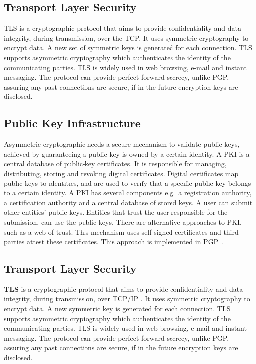 \subsection{Transport Layer Security}\label{chap:background:crypto:tls}

\ac{TLS} is a cryptographic protocol that aims to provide confidentiality and data integrity, during transmission, over the \ac{TCP}. It uses symmetric cryptography to encrypt data. A new set of symmetric keys is generated for each connection.
TLS supports asymmetric cryptography which authenticates the identity of the communicating parties.
TLS is widely used in web browsing, e-mail and instant messaging.
The protocol can provide perfect forward secrecy, unlike PGP, assuring any past connections are secure, if in the future encryption keys are disclosed.

\subsection{Public Key Infrastructure}\label{chap:background:PKI}

Asymmetric cryptographic needs a secure mechanism to validate public keys, achieved by guaranteeing a public key is owned by a certain identity.
A \ac{PKI} is a central database of public-key certificates. It is responsible for managing, distributing, storing and revoking digital certificates. Digital certificates map public keys to identities, and are used to verify that a specific public key belongs to a certain identity.
A \ac{PKI} has several components e.g.\ a registration authority, a certification authority and a central database of stored keys.
A user can submit other entities' public keys. Entities that trust the user responsible for the submission, can use the public keys.
There are alternative approaches to \ac{PKI}, such as a web of trust. This mechanism uses self-signed certificates and third parties attest these certificates. This approach is implemented in \ac{PGP}~\cite{modelingPKI}.

\subsection{Transport Layer Security}\label{chap:background:TLS}

\textbf{\ac{TLS}} is a cryptographic protocol that aims to provide confidentiality and data integrity, during transmission, over TCP/IP \cite{rescorla2018transport}. It uses symmetric cryptography to encrypt data. A new symmetric key is generated for each connection.
\ac{TLS} supports asymmetric cryptography which authenticates the identity of the communicating parties.
\ac{TLS} is widely used in web browsing, e-mail and instant messaging.
The protocol can provide perfect forward secrecy, unlike \ac{PGP}, assuring any past connections are secure, if in the future encryption keys are disclosed.

